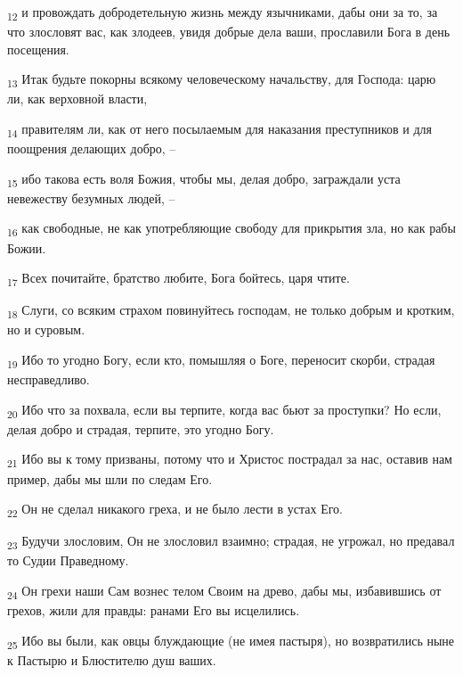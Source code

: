 \begin{tcolorbox}
\textsubscript{12} и провождать добродетельную жизнь между язычниками, дабы они за то, за что злословят вас, как злодеев, увидя добрые дела ваши, прославили Бога в день посещения.
\end{tcolorbox}
\begin{tcolorbox}
\textsubscript{13} Итак будьте покорны всякому человеческому начальству, для Господа: царю ли, как верховной власти,
\end{tcolorbox}
\begin{tcolorbox}
\textsubscript{14} правителям ли, как от него посылаемым для наказания преступников и для поощрения делающих добро, --
\end{tcolorbox}
\begin{tcolorbox}
\textsubscript{15} ибо такова есть воля Божия, чтобы мы, делая добро, заграждали уста невежеству безумных людей, --
\end{tcolorbox}
\begin{tcolorbox}
\textsubscript{16} как свободные, не как употребляющие свободу для прикрытия зла, но как рабы Божии.
\end{tcolorbox}
\begin{tcolorbox}
\textsubscript{17} Всех почитайте, братство любите, Бога бойтесь, царя чтите.
\end{tcolorbox}
\begin{tcolorbox}
\textsubscript{18} Слуги, со всяким страхом повинуйтесь господам, не только добрым и кротким, но и суровым.
\end{tcolorbox}
\begin{tcolorbox}
\textsubscript{19} Ибо то угодно Богу, если кто, помышляя о Боге, переносит скорби, страдая несправедливо.
\end{tcolorbox}
\begin{tcolorbox}
\textsubscript{20} Ибо что за похвала, если вы терпите, когда вас бьют за проступки? Но если, делая добро и страдая, терпите, это угодно Богу.
\end{tcolorbox}
\begin{tcolorbox}
\textsubscript{21} Ибо вы к тому призваны, потому что и Христос пострадал за нас, оставив нам пример, дабы мы шли по следам Его.
\end{tcolorbox}
\begin{tcolorbox}
\textsubscript{22} Он не сделал никакого греха, и не было лести в устах Его.
\end{tcolorbox}
\begin{tcolorbox}
\textsubscript{23} Будучи злословим, Он не злословил взаимно; страдая, не угрожал, но предавал то Судии Праведному.
\end{tcolorbox}
\begin{tcolorbox}
\textsubscript{24} Он грехи наши Сам вознес телом Своим на древо, дабы мы, избавившись от грехов, жили для правды: ранами Его вы исцелились.
\end{tcolorbox}
\begin{tcolorbox}
\textsubscript{25} Ибо вы были, как овцы блуждающие (не имея пастыря), но возвратились ныне к Пастырю и Блюстителю душ ваших.
\end{tcolorbox}
